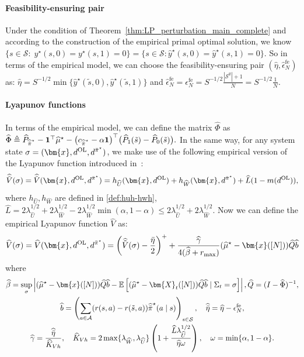 \documentclass[mnsc,nonblindrev]{informs3}
\newcommand{\E}{\mathbb{E}}
\newcommand{\lwhat}{\lambda_{\widehat{W}}}
\newcommand{\luhat}{\lambda_{\widehat{U}}}
\newcommand{\lwhhalf}{\lambda_{\widehat{W}}^{1/2}}
\newcommand{\luhhalf}{\lambda_{\widehat{U}}^{1/2}}
\newcommand{\Vhat}{\widehat{V}}
\newcommand{\Phat}{\widehat{P}}
\newcommand{\pibst}{\Bar{\pi}^\star}
\newcommand{\pihbst}{\widehat{\Bar{\pi}}^\star}
\newcommand{\Qhat}{\widehat{Q}}
\newcommand{\bmx}{\bm{x}}
\newcommand{\phihat}{\widehat{\Phi}}
\newcommand{\States}{\mathcal{S}}
\newcommand{\Actions}{\mathcal{A}}
\newcommand{\uhat}{\widehat{U}}
\newcommand{\enfe}{\epsilon_N^{\mathrm{fe}}}
\newcommand{\muhst}{\widehat{\mu}^\star}
\begin{document}
\begin{APPENDICES}
\paragraph{Feasibility-ensuring pair} Under the condition of Theorem~\ref{thm:LP_perturbation_main_complete} and according to the construction of the empirical primal optimal solution, we know
$
    \{s\in\mathcal S:\; y^\star(s,0)=y^\star(s,1)=0\}=\{s\in\mathcal S:\widehat y^\star(s,0)=\widehat y^\star(s,1)=0\}.
$
So in terms of the empirical model, we can choose the feasibility-ensuring pair $(\widehat\eta,\widehat\epsilon_N^{\mathrm{fe}})$ as:
$
\widehat\eta = S^{-1/2}\min\{\widehat y^\star(\tilde s,0),\widehat y^\star(\tilde s,1)\}
$
and
$
\widehat \epsilon_N^{\mathrm{fe}}=\enfe = S^{-1/2}\frac{|\mathcal S^{\emptyset}|+1}{N}=S^{-1/2}\frac{1}{N}.
$
    
\paragraph{Lyapunov functions}
In terms of the empirical model, we can define the matrix $\phihat$ as
$
    \phihat \triangleq \Phat_{\pihbst}-\mathbf 1^{\top}\muhst
    -\bigl(c_{\pihbst}-\alpha\mathbf 1\bigr)^{\top}\bigl(\Phat_1(\tilde s)-\Phat_0(\tilde s)\bigr).
$
In the same way, for any system state $\sigma=(\bmx,d^{\mathrm{OL}},d^{\pibst})$, we make use of the following empirical version of the Lyapunov function introduced in~\citet{hong2024achieving}:
\begin{equation*}%
    \widehat{\tilde{V}}(\sigma)=\widehat{\tilde{V}}(\bmx,d^{\mathrm{OL}},d^{\pibst})=h_{\uhat}(\bmx,d^{\mathrm{OL}})+h_{\widehat{W}}(\bmx,d^{\pibst})+\widehat L(1-m(d^{\mathrm{OL}})),
\end{equation*}
where $h_{\uhat}, h_{\widehat W}$ are defined in \eqref{def:huh-hwh}, \(\widehat L = 2\luhhalf+2\lwhhalf-2\lwhhalf\min(\alpha,1-\alpha)\le2\luhhalf+2\lwhhalf\).
Now we can define the empirical Lyapunov function $\Vhat$ as:
\begin{equation}\label{equ:defi-Vhat}
    \Vhat(\sigma)=\Vhat(\bmx,d^{\mathrm{OL}},d^{\pibst})=\left(\widehat {\tilde V}(\sigma)-\frac{\bar\eta}{2}\right)^++\frac{\widehat\gamma}{4(\widehat \beta+r_{\max})}(\muhst-\bmx([N]))\Qhat \widehat b
\end{equation}
where
\begin{equation}\label{eq:def-hat-beta-Q-b-bareta-gamma}
    \begin{gathered}
        \widehat \beta=\sup_\sigma\left|(\muhst-\bmx([N]))\Qhat \widehat b-\E\left[(\muhst-\bm{X}_t([N]))\Qhat\widehat b\mid \Sigma_t=\sigma\right]\right|, \Qhat=(I-\phihat)^{-1},\\
        \widehat b=\left(\sum_{a\in\Actions}(r(s,a)-r(\tilde s,a))\pihbst(a\mid s)\right)_{s\in\States}, \quad \widehat{\bar\eta}=\widehat \eta-\enfe,\\
        \widehat\gamma=\frac{\widehat{\bar\eta}}{\widehat K_{Vh}},
        \quad \widehat K_{Vh}=2\max\{\lwhat,\luhat\}\left(1+\frac{\widehat L\luhhalf}{\widehat\eta\omega}\right), 
        \quad \omega=\min\{\alpha,1-\alpha\}.
    \end{gathered}
\end{equation}


\end{APPENDICES}
\end{document}
